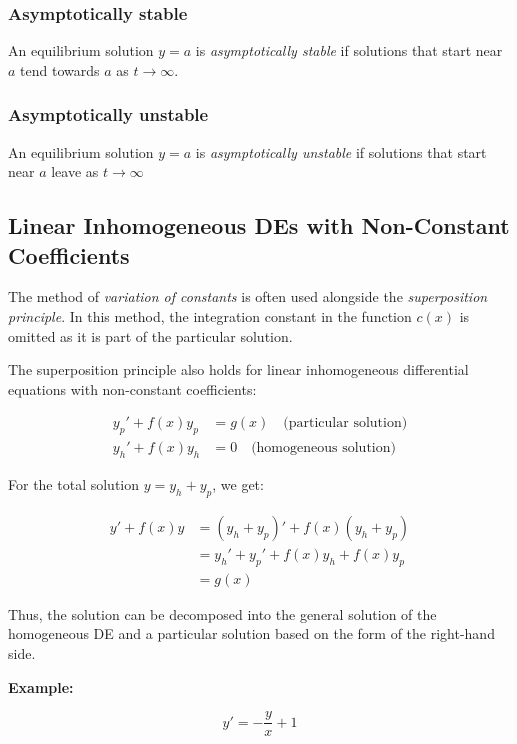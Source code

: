 \subsubsection*{Asymptotically stable}
An equilibrium solution \(y = a\) is \emph{asymptotically stable} if solutions
that start near \(a\) tend towards \(a\) as \(t \to \infty\).

\subsubsection*{Asymptotically unstable}
An equilibrium solution \(y = a\) is \emph{asymptotically unstable} if solutions
that start near \(a\) leave as \(t \to \infty\)

\subsection{Linear Inhomogeneous DEs with Non-Constant Coefficients}

The method of \emph{variation of constants} is often used alongside the \emph{superposition principle}. In this method, the integration constant in the function \( c(x) \) is omitted as it is part of the particular solution.
\vspace{\baselineskip}

The superposition principle also holds for linear inhomogeneous differential equations with non-constant coefficients:

\begin{align*}
y_p' + f(x)y_p &= g(x) \quad \text{(particular solution)} \\
y_h' + f(x)y_h &= 0 \quad \text{(homogeneous solution)}
\end{align*}

For the total solution \( y = y_h + y_p \), we get:

\begin{align*}
y' + f(x)y 
&= (y_h + y_p)' + f(x)(y_h + y_p) \\
&= y_h' + y_p' + f(x)y_h + f(x)y_p \\
&= g(x)
\end{align*}

Thus, the solution can be decomposed into the general solution of the homogeneous DE and a particular solution based on the form of the right-hand side.
\vspace{\baselineskip}

\textbf{Example: }

\[y' = -\frac{y}{x} + 1\]

